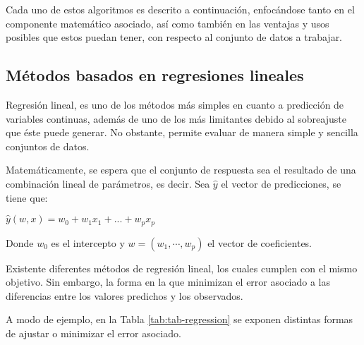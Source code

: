 Cada uno de estos algoritmos es descrito a continuación, enfocándose tanto en el componente matemático asociado, así como también en las ventajas y usos posibles que estos puedan tener, con respecto al conjunto de datos a trabajar.

\subsection{Métodos basados en regresiones lineales}

Regresión lineal, es uno de los métodos más simples en cuanto a predicción de variables continuas, además de uno de los más limitantes debido al sobreajuste que éste puede generar. No obstante, permite evaluar de manera simple y sencilla conjuntos de datos. 

Matemáticamente, se espera que el conjunto de respuesta sea el resultado de una combinación lineal de parámetros, es decir. Sea $\hat{y}$ el vector de predicciones, se tiene que:

\begin{center}
	$\hat{y}(w, x) = w_0 + w_1 x_1 + ... + w_p x_p$
\end{center}

Donde $w_0$ es el intercepto y $w = (w_1,\cdots, w_p)$ el vector de coeficientes.

Existente diferentes métodos de regresión lineal, los cuales cumplen con el mismo objetivo. Sin embargo, la forma en la que minimizan el error asociado a las diferencias entre los valores predichos y los observados.

A modo de ejemplo, en la Tabla \ref{tab:tab-regression} se exponen distintas formas de ajustar o minimizar el error asociado.

